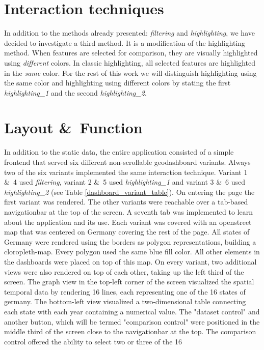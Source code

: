 \section{Interaction techniques}
In addition to the methods already presented: \textit{filtering} and \textit{highlighting}, we have decided to investigate a third
method. It is a modification of the highlighting method. When features are selected for comparison, they are visually highlighted using
\textit{different} colors. In classic highlighting, all selected features are highlighted in the \textit{same} color. For the rest of
this work we will distinguish highlighting using the same color and highlighting using different colors by stating the first
\textit{highlighting\_1} and the second \textit{highlighting\_2}.

\section{Layout \&\ Function}
In addition to the static data, the entire application consisted of a simple frontend that served six different non-scrollable
geodashboard variants. Always two of the six variants implemented the same interaction technique. Variant 1 \&\ 4 used
\textit{filtering}, variant 2 \&\ 5 used \textit{highlighting\_1} and variant 3 \&\ 6 used \textit{highlighting\_2}
(see Table \ref{dashboard_variant_table}). On entering the page the first variant was rendered. The other variants were reachable over a
tab-based navigationbar at the top of the screen. A seventh tab was implemented to learn about the application and its use.
Each variant was covered with an openstreet map that was centered on Germany covering the rest of the page. All states of
Germany were rendered using the borders as polygon representations, building a cloropleth-map. Every polygon used the same
blue fill color. All other elements in the dashboards were placed on top of this map. On every variant, two additional views
were also rendered on top of each other, taking up the left third of the screen. The graph view in the top-left corner of the
screen visualized the spatial temporal data by rendering 16 lines, each representing one of the 16 states of germany. The
bottom-left view visualized a two-dimensional table connecting each state with each year containing a numerical value. The
"dataset control" and another button, which will be termed "comparison control" were positioned in the middle third of the
screen close to the navigationbar at the top. The comparison control offered the ability to select two or three of the 16
